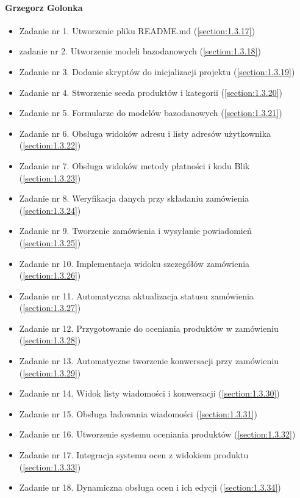 \documentclass[12pt,a4paper,oneside]{article}
\theoremstyle{definition}
\numberwithin{equation}{section}
\begin{document}
\paragraph{Grzegorz Golonka}
\begin{itemize} 
    \item Zadanie nr 1. Utworzenie pliku README.md                          (\ref{section:1.3.17})
    \item zadanie nr 2. Utworzenie modeli bazodanowych                      (\ref{section:1.3.18})
    \item Zadanie nr 3. Dodanie skryptów do inicjalizacji projektu          (\ref{section:1.3.19})
    \item Zadanie nr 4. Stworzenie seeda produktów i kategorii              (\ref{section:1.3.20})
    \item Zadanie nr 5. Formularze do modelów bazodanowych                  (\ref{section:1.3.21})
    \item Zadanie nr 6. Obsługa widoków adresu i listy adresów użytkownika  (\ref{section:1.3.22})
    \item Zadanie nr 7. Obsługa widoków metody płatności i kodu Blik        (\ref{section:1.3.23})
    \item Zadanie nr 8. Weryfikacja danych przy składaniu zamówienia               (\ref{section:1.3.24})
    \item Zadanie nr 9. Tworzenie zamówienia i wysyłanie powiadomień               (\ref{section:1.3.25})
    \item Zadanie nr 10. Implementacja widoku szczegółów zamówienia              (\ref{section:1.3.26})
    \item Zadanie nr 11. Automatyczna aktualizacja statusu zamówienia              (\ref{section:1.3.27})
    \item Zadanie nr 12. Przygotowanie do oceniania produktów w zamówieniu             (\ref{section:1.3.28})
    \item Zadanie nr 13. Automatyczne tworzenie konwersacji przy zamówieniu             (\ref{section:1.3.29})
    \item Zadanie nr 14. Widok listy wiadomości i konwersacji              (\ref{section:1.3.30})
    \item Zadanie nr 15. Obsługa ładowania wiadomości              (\ref{section:1.3.31})
    \item Zadanie nr 16. Utworzenie systemu oceniania produktów             (\ref{section:1.3.32})
    \item Zadanie nr 17. Integracja systemu ocen z widokiem produktu            (\ref{section:1.3.33})
    \item Zadanie nr 18.  Dynamiczna obsługa ocen i ich edycji             (\ref{section:1.3.34})

\end{itemize}
\end{document}
